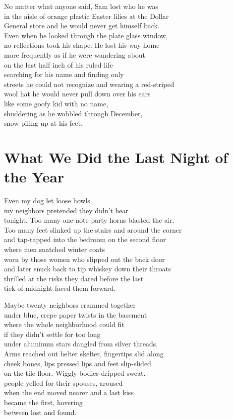 \documentclass[twoside,10pt]{book}
\begin{document}
No matter what anyone said, Sam lost who he was\\
in the aisle of orange plastic Easter lilies at the Dollar\\
General store and he would never get himself back.\\
Even when he looked through the plate glass window,\\
no reflections took his shape. He lost his way home\\
more frequently as if he were wandering about\\
on the last half inch of his ruled life\\
searching for his name and finding only\\
streets he could not recognize and wearing a red-striped\\
wool hat he would never pull down over his ears\\
like some goofy kid with no name,\\
shuddering as he wobbled through December,\\
snow piling up at his feet.


\clearpage
\section{What We Did the Last Night of the Year}

Even my dog let loose howls\\
my neighbors pretended they didn't hear\\
tonight. Too many one-note party horns blasted the air.\\
Too many feet slinked up the stairs and around the corner\\
and tap-tapped into the bedroom on the second floor\\
where men snatched winter coats\\
worn by those women who slipped out the back door\\
and later snuck back to tip whiskey down their throats\\
thrilled at the risks they dared before the last\\
tick of midnight faced them forward.

Maybe twenty neighbors crammed together\\
under blue, crepe paper twists in the basement\\
where the whole neighborhood could fit\\
if they didn't settle for too long\\
under aluminum stars dangled from silver threads.\\
Arms reached out helter skelter, fingertips slid along\\
cheek bones, lips pressed lips and feet slip-slided\\
on the tile floor. Wiggly bodies dripped sweat.\\
people yelled for their spouses, aroused\\
when the end moved nearer and a last kiss\\
became the first, hovering\\
between lost and found.
\end{document}
